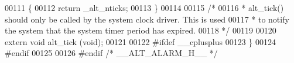 \begin{DoxyCode}
00111 \{
00112   \textcolor{keywordflow}{return} _alt_nticks;
00113 \}
00114 
00115 \textcolor{comment}{/*}
00116 \textcolor{comment}{ * alt\_tick() should only be called by the system clock driver. This is used}
00117 \textcolor{comment}{ * to notify the system that the system timer period has expired.}
00118 \textcolor{comment}{ */}
00119 
00120 \textcolor{keyword}{extern} \textcolor{keywordtype}{void} alt_tick (\textcolor{keywordtype}{void});
00121 
00122 \textcolor{preprocessor}{#ifdef \_\_cplusplus}
00123 \}
00124 \textcolor{preprocessor}{#endif}
00125 
00126 \textcolor{preprocessor}{#endif }\textcolor{comment}{/* \_\_ALT\_ALARM\_H\_\_ */}\textcolor{preprocessor}{}
\end{DoxyCode}
